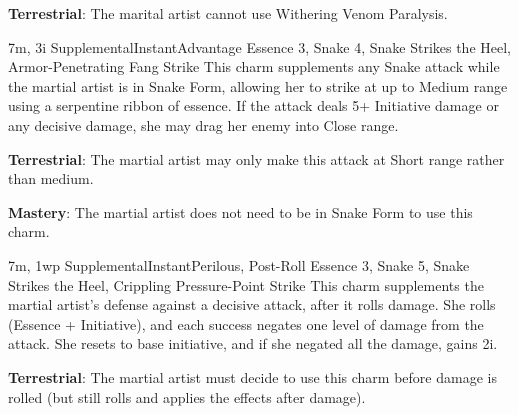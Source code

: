 \textbf{Terrestrial}: The marital artist cannot use Withering Venom Paralysis.

{7m, 3i}
{Supplemental}{Instant}{Advantage}
{Essence 3, Snake 4, Snake Strikes the Heel, Armor-Penetrating Fang Strike}
This charm supplements any Snake attack while the martial artist is in Snake Form, allowing her to strike at up to Medium range using a serpentine ribbon of essence. If the attack deals 5+ Initiative damage or any decisive damage, she may drag her enemy into Close range.

\textbf{Terrestrial}: The martial artist may only make this attack at Short range rather than medium.

\textbf{Mastery}: The martial artist does not need to be in Snake Form to use this charm.

{7m, 1wp}
{Supplemental}{Instant}{Perilous, Post-Roll}
{Essence 3, Snake 5, Snake Strikes the Heel, Crippling Pressure-Point Strike}
This charm supplements the martial artist's defense against a decisive attack, after it rolls damage. She rolls (Essence + Initiative), and each success negates one level of damage from the attack. She resets to base initiative, and if she negated all the damage, gains 2i.

\textbf{Terrestrial}: The martial artist must decide to use this charm before damage is rolled (but still rolls and applies the effects after damage).
